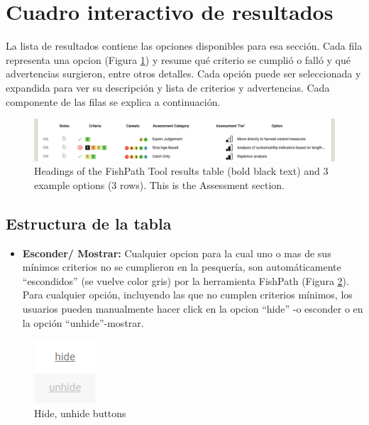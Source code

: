 \documentclass[
  11pt,
]{book}
\providecommand{\tightlist}{%
  \setlength{\itemsep}{0pt}\setlength{\parskip}{0pt}}
\begin{document}
\hypertarget{interactive-results-table}{%
\section{Cuadro interactivo de resultados}\label{interactive-results-table}}

La lista de resultados contiene las opciones disponibles para esa sección. Cada fila representa una opcion (Figura \ref{fig:result-rows}) y resume qué criterio se cumplió o falló y qué advertencias surgieron, entre otros detalles. Cada opción puede ser seleccionada y expandida para ver su descripción y lista de criterios y advertencias. Cada componente de las filas se explica a continuación.

\begin{figure}

{\centering \includegraphics[width=0.95\linewidth]{images/results-rows} 

}

\caption{Headings of the FishPath Tool results table (bold black text) and 3 example options (3 rows). This is the Assessment section.}\label{fig:result-rows}
\end{figure}

\hypertarget{estructura-de-la-tabla}{%
\subsection{Estructura de la tabla}\label{estructura-de-la-tabla}}

\begin{itemize}
\tightlist
\item
  \textbf{Esconder/ Mostrar:} Cualquier opcion para la cual uno o mas de sus mínimos criterios no se cumplieron en la pesquería, son automáticamente ``escondidos'' (se vuelve color gris) por la herramienta FishPath (Figura \ref{fig:hide}). Para cualquier opción, incluyendo las que no cumplen criterios mínimos, los usuarios pueden manualmente hacer click en la opcion ``hide'' -o esconder o en la opción ``unhide''-mostrar.
\end{itemize}

\begin{figure}

{\centering \includegraphics[width=0.1\linewidth]{images/hide} 

}

\caption{Hide, unhide buttons}\label{fig:hide}
\end{figure}
\end{document}
